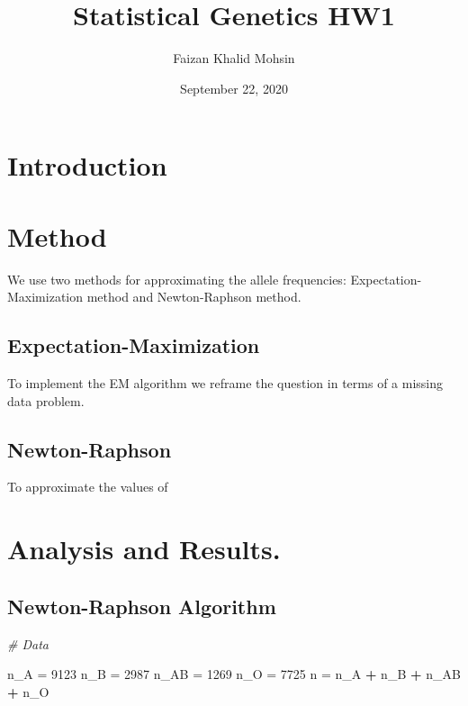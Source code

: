 \documentclass[]{article}
\title{Statistical Genetics HW1}
\author{Faizan Khalid Mohsin}
\date{September 22, 2020}
\newenvironment{Shaded}{\begin{snugshade}}{\end{snugshade}}
\newcommand{\DecValTok}[1]{\textcolor[rgb]{0.00,0.00,0.81}{#1}}
\newcommand{\StringTok}[1]{\textcolor[rgb]{0.31,0.60,0.02}{#1}}
\newcommand{\CommentTok}[1]{\textcolor[rgb]{0.56,0.35,0.01}{\textit{#1}}}
\newcommand{\OperatorTok}[1]{\textcolor[rgb]{0.81,0.36,0.00}{\textbf{#1}}}
\newcommand{\NormalTok}[1]{#1}
\begin{document}
\maketitle

\section{Introduction}\label{introduction}

\section{Method}\label{method}

We use two methods for approximating the allele frequencies:
Expectation-Maximization method and Newton-Raphson method.

\subsection{Expectation-Maximization}\label{expectation-maximization}

To implement the EM algorithm we reframe the question in terms of a
missing data problem.

\subsection{Newton-Raphson}\label{newton-raphson}

To approximate the values of

\section{Analysis and Results.}\label{analysis-and-results.}

\subsection{Newton-Raphson Algorithm}\label{newton-raphson-algorithm}

\begin{Shaded}
\begin{Highlighting}[]
\CommentTok{# Data}

\NormalTok{n_A =}\StringTok{ }\DecValTok{9123}
\NormalTok{n_B =}\StringTok{ }\DecValTok{2987}
\NormalTok{n_AB =}\StringTok{ }\DecValTok{1269}
\NormalTok{n_O =}\StringTok{ }\DecValTok{7725}
\NormalTok{n =}\StringTok{ }\NormalTok{n_A }\OperatorTok{+}\StringTok{ }\NormalTok{n_B }\OperatorTok{+}\StringTok{ }\NormalTok{n_AB }\OperatorTok{+}\StringTok{ }\NormalTok{n_O}
\end{Highlighting}
\end{Shaded}
\end{document}
